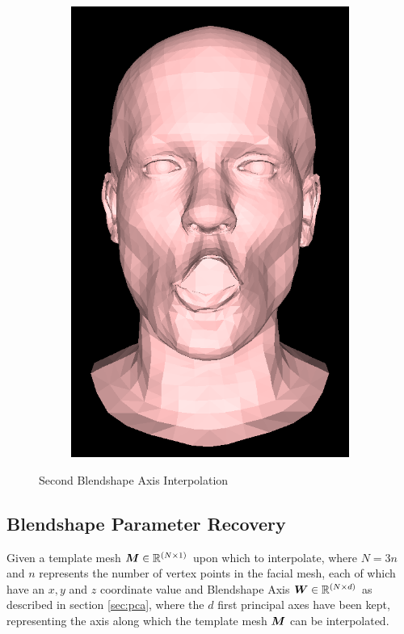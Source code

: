 \begin{figure}[h]
\begin{subfigure}[b]{0.24\textwidth}
        \includegraphics[width=\textwidth]{figures/blendshape_interp/2/00004.png}
    \end{subfigure}
    \caption{Second Blendshape Axis Interpolation}\label{fig:Blendshape_axis_2}
\end{figure}

\subsection{Blendshape Parameter Recovery} \label{sec:blendshape_recovery}
Given a template mesh ${\boldsymbol{{M}}} \in \mathbb{R}^{(N \times 1)}$ upon which to interpolate, where $N = 3n$ and $n$ represents the number of vertex points in the facial mesh, each of which have an $x, y$ and $z$ coordinate value and Blendshape Axis ${\boldsymbol{{W}}} \in \mathbb{R}^{(N \times d)}$ as described in section \ref{sec:pca}, where the $d$ first principal axes have been kept, representing the axis along which the template mesh ${\boldsymbol{{M}}}$ can be interpolated.

